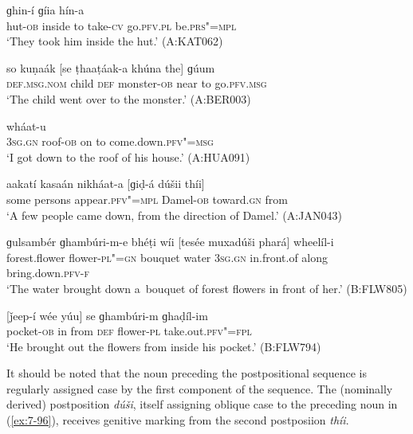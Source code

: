 \begin{exe}
\ex
\label{ex:7-93}
 ɡhin-í ɡíia hín-a \\
hut-\textsc{ob} inside to take-\textsc{cv} go.\textsc{pfv.pl} be.\textsc{prs"=mpl} \\
\glt `They took him inside the hut.' (A:KAT062)
\end{exe}
\begin{exe}
\ex
\label{ex:7-94}
\gll so kuṇaák [se ṭhaaṭáak-a khúna the] ɡúum \\
\textsc{def.msg.nom} child \textsc{def} monster-\textsc{ob} near to go.\textsc{pfv.msg} \\
\glt `The child went over to the monster.' (A:BER003)
\end{exe}
\begin{exe}
\ex
\label{ex:7-95}
 wháat-u \\
\textsc{3sg.gn} roof-\textsc{ob} on to come.down.\textsc{pfv"=msg}  \\
\glt `I got down to the roof of his house.' (A:HUA091)
\end{exe}
\begin{exe}
\ex
\label{ex:7-96}
\gll aakatí kasaán nikháat-a [ɡiḍ-á dúšii \textmd{thíi]} \\
some persons appear.\textsc{pfv"=mpl} Damel-\textsc{ob} toward.\textsc{gn} from \\
\glt `A few people came down, from the direction of Damel.' (A:JAN043)
\end{exe}
\begin{exe}
\ex
\label{ex:7-97}
\gll ɡulsambér ɡhambúri-m-e bhéṭi wíi [tesée muxadúši phará]
wheelíl-i \\
forest.flower flower-\textsc{pl"=gn} bouquet water \textsc{3sg.gn} in.front.of along bring.down.\textsc{pfv-f} \\
\glt `The water brought down a~bouquet of forest flowers in front of her.' (B:FLW805)
\end{exe}
\begin{exe}
\ex
\label{ex:7-98}
\gll \label{bkm:Ref193771773}[ǰeep-í wée yúu] se ɡhambúri-m ɡhaḍíl-im \\
pocket-\textsc{ob} in from \textsc{def} flower-\textsc{pl}  take.out.\textsc{pfv"=fpl} \\
\glt `He brought out the flowers from inside his pocket.' (B:FLW794)
\end{exe}

It should be noted that the noun preceding the postpositional sequence is regularly assigned case by the first component of the sequence. The (nominally derived) postposition \textit{dúši}, itself assigning oblique case to the preceding noun in (\ref{ex:7-96}), receives genitive marking from the second postposiion \textit{thíi}.


